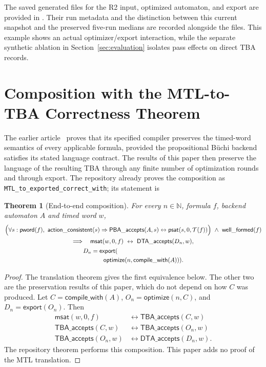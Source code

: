 \documentclass{ieeeaccess}
\providecommand{\Nat}{\mathbb{N}}
\providecommand{\T}{\mathcal{T}}
\providecommand{\optimize}{\mathsf{optimize}}
\providecommand{\export}{\mathsf{export}}
\newtheorem{theorem}{Theorem}[section]
\begin{document}
The saved generated files for the R2 input, optimized automaton, and export
are provided in . Their run
metadata and the distinction between this current snapshot and the preserved
five-run medians are recorded alongside the files. This example shows an
actual optimizer/export interaction, while the separate synthetic ablation
in Section~\ref{sec:evaluation} isolates pass effects on direct TBA records.

\section{Composition with the MTL-to-TBA Correctness Theorem}
\label{sec:composition}
The earlier article~\cite{fares_bodeveix_mtl_translation} proves that its specified compiler preserves the
timed-word semantics of every applicable formula, provided the propositional
B\"uchi backend satisfies its stated language contract. The results of this
paper then preserve the language of the resulting TBA through any finite
number of optimization rounds and through export. The repository already
proves the composition as \texttt{MTL\_to\_exported\_correct\_with}; its
statement is
\begin{theorem}[End-to-end composition]
\label{thm:composition}
For every $n\in\Nat$, formula $f$, backend automaton $A$ and timed word $w$,
\[
\begin{gathered}
  \Bigl(\forall s:\mathsf{pword}(f),\
       \mathsf{action\_consistent}(s)\Rightarrow
       \mathsf{PBA\_accepts}(A,s)\leftrightarrow
       \mathsf{psat}(s,0,\T(f))\Bigr)\ \land\ \mathsf{well\_formed}(f)
  \\
  \Longrightarrow\quad
  \mathsf{msat}(w,0,f)\ \leftrightarrow\
  \mathsf{DTA\_accepts}(D_n,w),
  \\
  \begin{aligned}
  D_n &= \export(\\
        &\qquad\optimize(n,\mathsf{compile\_with}(A))).
  \end{aligned}
\end{gathered}
\]
\end{theorem}
\begin{proof}
The translation theorem
gives the first equivalence below. The other two are the preservation results of
this paper, which do not depend on how $C$ was produced. Let $C=\mathsf{compile\_with}(A)$,
$O_n=\optimize(n,C)$, and $D_n=\export(O_n)$. Then
\[
\begin{aligned}
\mathsf{msat}(w,0,f) &\leftrightarrow \mathsf{TBA\_accepts}(C,w)\\
\mathsf{TBA\_accepts}(C,w) &\leftrightarrow \mathsf{TBA\_accepts}(O_n,w)\\
\mathsf{TBA\_accepts}(O_n,w) &\leftrightarrow \mathsf{DTA\_accepts}(D_n,w).
\end{aligned}
\]
The repository theorem
performs this composition. This paper adds no proof of the MTL translation.
\end{proof}
\end{document}
